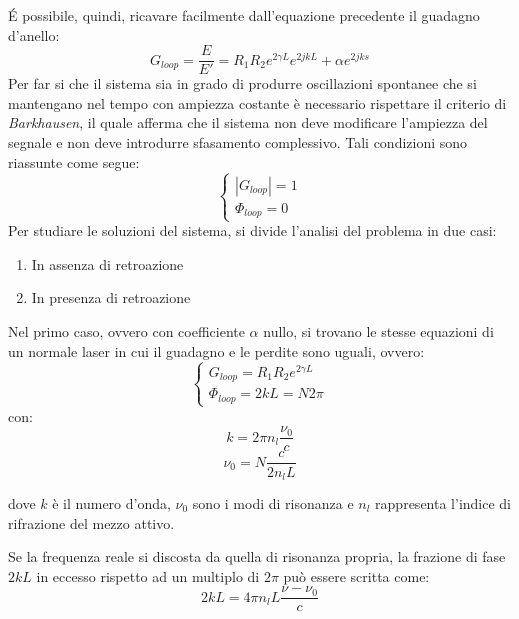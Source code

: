 \'E possibile, quindi, ricavare facilmente dall'equazione precedente il guadagno d'anello:
\begin{equation}
	G_{loop}=\frac{E}{E'}=R_1R_2e^{2\gamma L}e^{2jkL}+\alpha e^{2jks}
	\label{gloop}
\end{equation}
Per far si che il sistema sia in grado di produrre oscillazioni spontanee che si mantengano nel tempo con ampiezza costante è necessario rispettare il criterio di \textit{Barkhausen}, il quale afferma che il sistema non deve modificare l'ampiezza del segnale e non deve introdurre sfasamento complessivo. Tali condizioni sono riassunte come segue:
\begin{equation}
	\begin{cases}
   |G_{loop}|=1\\\Phi_{loop} = 0
   \end{cases}
\end{equation}
Per studiare le soluzioni del sistema, si divide l'analisi del problema in due casi:
\begin{enumerate}
	\item In assenza di retroazione 
	\item In presenza di retroazione
\end{enumerate}
Nel primo caso, ovvero con coefficiente $\alpha$ nullo, si trovano le stesse equazioni di un normale laser in cui il guadagno e le perdite sono uguali, ovvero:
\begin{equation}
	\begin{cases}
   G_{loop}=R_1R_2e^{2\gamma L}\\\Phi_{loop} = 2kL=N2\pi
   \end{cases}
   \label{sistnoretr}
\end{equation}
con:
\begin{equation}
k=2\pi n_l \frac{\nu_0}{c}	
\end{equation}
\begin{equation}
	\nu_0 = N\frac{c}{2n_lL}
\end{equation}

dove $k$ è il numero d'onda, $\nu_0$ sono i modi di risonanza e $n_l$ rappresenta l'indice di rifrazione del mezzo attivo.

Se la frequenza reale si discosta da quella di risonanza propria, la frazione di fase $2kL$ in eccesso rispetto ad un multiplo di $2\pi$ può essere scritta come:
\begin{equation}
	2kL=4\pi n_l L \frac{\nu - \nu_0}{c}
\end{equation}

